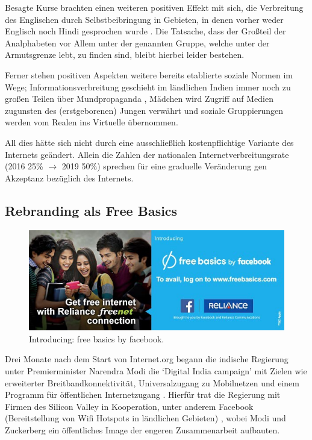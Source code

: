 \documentclass{article}
\begin{document}
\medskip

Besagte Kurse brachten einen weiteren positiven Effekt mit sich, die Verbreitung des Englischen durch Selbstbeibringung in Gebieten, in denen vorher weder Englisch noch Hindi gesprochen wurde \parencite{empowermentThroughFacebook}. Die Tatsache, dass der Großteil der Analphabeten vor Allem unter der genannten Gruppe, welche unter der Armutsgrenze lebt, zu finden sind, bleibt hierbei leider bestehen.

\medskip

Ferner stehen positiven Aspekten weitere bereits etablierte soziale Normen im Wege; Informationsverbreitung geschieht im ländlichen Indien immer noch zu großen Teilen über Mundpropaganda \parencite[259]{everydayLife}, Mädchen wird Zugriff auf Medien zugunsten des (erstgeborenen) Jungen verwährt \parencite{empowermentThroughFacebook} und soziale Gruppierungen werden vom Realen ins Virtuelle übernommen.

\medskip

All dies hätte sich nicht durch eine ausschließlich kostenpflichtige Variante des Internets geändert.
Allein die Zahlen der nationalen Internetverbreitungsrate (2016 25\% $\to$ 2019 50\%) sprechen für eine graduelle Veränderung gen Akzeptanz bezüglich des Internets.

\subsection{Rebranding als Free Basics} \label{rebranding}

\begin{figure}[h!]
  \begin{center}
    \includegraphics[scale=0.6]{intro}
    \caption{Introducing: free basics by facebook\autocite{introFB}.}
  \end{center}
\end{figure}

Drei Monate nach dem Start von Internet.org begann die indische Regierung unter Premierminister Narendra Modi die `Digital India campaign' mit Zielen wie erweiterter Breitbandkonnektivität, Universalzugang zu Mobilnetzen und einem Programm für öffentlichen Internetzugang \parencite{digitalPillars}.
Hierfür trat die Regierung mit Firmen des Silicon Valley in Kooperation, unter anderem Facebook (Bereitstellung von Wifi Hotspots in ländlichen Gebieten) \parencite[254]{everydayLife},
wobei Modi und Zuckerberg ein öffentliches Image der engeren Zusammenarbeit aufbauten.
\end{document}
